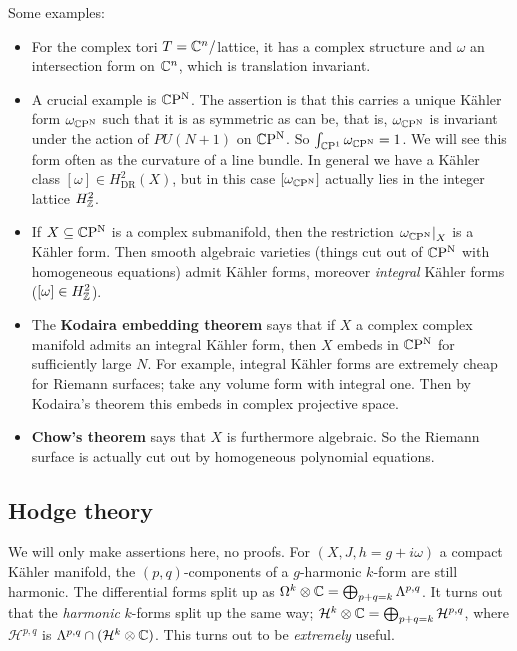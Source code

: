\begin{example}
    Some examples:
    \begin{itemize}
    \setlength\itemsep{-.2em}
        \item For the complex tori $T = \mathbb{C}^n  /$lattice, it has a complex structure and $\omega$ an intersection form on $\mathbb{C}^n $, which is translation invariant.
        \item  A crucial example is $\mathbb{C} \mathrm{P^N }$. The assertion is that this carries a unique K\"ahler form $\omega_{\mathbb{C} \mathrm{P^N }}$ such that it is as symmetric as can be, that is, $\omega _{\mathbb{C}\mathrm{P^N}}$ is invariant under the action of $PU(N+1)$ on $\mathbb{C} \mathrm{P^N}$. So $\int _{\mathbb{C} \mathrm{P^1}}\omega _{\mathbb{C}\mathrm{P^N}}=1$. We will see this form often as the curvature of a line bundle. In general we have a K\"ahler class $[\omega] \in H^2_{\mathrm{DR}}(X)$, but in this case $[\omega _{\mathbb{C} \mathrm{P^N}}]$ actually lies in the integer lattice $H^2_{\mathbb{Z}}$.
        \item If $X \subseteq \mathbb{C} \mathrm{P^N}$ is a complex submanifold, then the restriction $\left. \omega _{\mathbb{C} \mathrm{P^N}} \right| _X$ is a K\"ahler form. Then smooth algebraic varieties (things cut out of $\mathbb{C} \mathrm{P^N}$ with homogeneous equations) admit K\"ahler forms, moreover \emph{integral} K\"ahler forms ($[\omega] \in H^2_{\mathbb{Z}}$).
            \item The \textbf{Kodaira embedding theorem} says that if $X$ a complex complex manifold admits an integral K\"ahler form, then $X$ embeds in $\mathbb{C} \mathrm{P^N}$ for sufficiently large $N$. For example, integral K\"ahler forms are extremely cheap for Riemann surfaces; take any volume form with integral one. Then by Kodaira's theorem this embeds in complex projective space.
            \item \textbf{Chow's theorem} says that $X$ is furthermore algebraic. So the Riemann surface is actually cut out by homogeneous polynomial equations.
    \end{itemize}
\end{example}

\subsection{Hodge theory}
We will only make assertions here, no proofs. For $(X,J, h = g+ i\omega)$ a compact K\"ahler manifold, the $(p,q)$-components of a $g$-harmonic $k$-form are still harmonic. The differential forms split up as $\Omega^k \otimes \mathbb{C} = \bigoplus_{p+q=k} \Lambda^{p,q}$. It turns out that the \emph{harmonic} $k$-forms split up the same way; $\mathcal H^k \otimes \mathbb{C} = \bigoplus _{p+q=k}\mathcal H^{p,q}$,  where $\mathcal H ^{p,q}$ is $\Lambda ^{p,q}\cap (\mathcal H^k\otimes \mathbb{C})$. This turns out to be \emph{extremely} useful.

